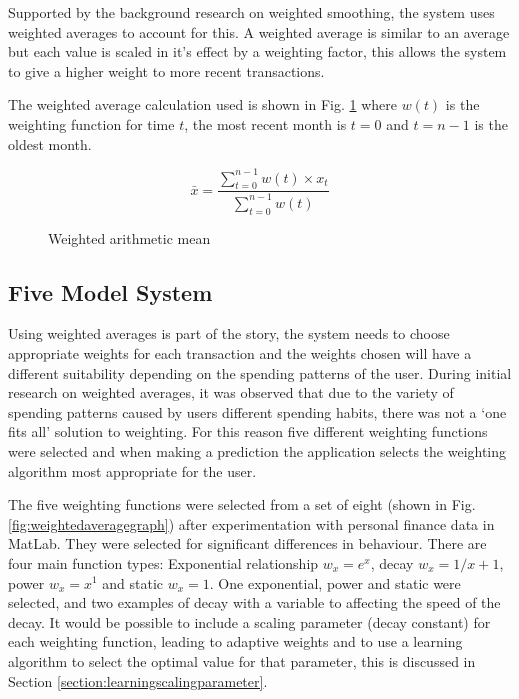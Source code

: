 Supported by the background research on weighted smoothing, the system uses weighted averages to account for this. A weighted average is similar to an average but each value is scaled in it's effect by a weighting factor, this allows the system to give a higher weight to more recent transactions.

The weighted average calculation used is shown in Fig. \ref{fig:weighting} where $w(t)$ is the weighting function for time $t$, the most recent month is $t = 0$ and $t = n - 1$ is the oldest month. 

\begin{figure}[h]
    \centering
    \[
        \bar{x} = 
        \frac{
                \sum\limits^{n-1}_{t=0}{w(t) \times x_t}
            }{
                \sum\limits_{t=0}^{n-1}{w(t)}
        } 
    \]
    \caption{Weighted arithmetic mean}
    \label{fig:weighting}
\end{figure}

\subsection{Five Model System}
Using weighted averages is part of the story, the system needs to choose appropriate weights for each transaction and the weights chosen will have a different suitability depending on the spending patterns of the user.
% 
During initial research on weighted averages, it was observed that due to the variety of spending patterns caused by users different spending habits, there was not a `one fits all' solution to weighting.
%
For this reason five different weighting functions were selected and when making a prediction the application selects the weighting algorithm most appropriate for the user.

The five weighting functions were selected from a set of eight (shown in Fig. \ref{fig:weightedaveragegraph}) after experimentation with personal finance data in MatLab. They were selected for significant differences in behaviour.
%
There are four main function types: Exponential relationship $w_x = e^{x}$, decay $w_x = {1}/{x + 1}$, power $w_x = x^1 $ and static $w_x = 1$. One exponential, power and static were selected, and two examples of decay with a variable to affecting the speed of the decay. It would be possible to include a scaling parameter (decay constant) for each weighting function, leading to adaptive weights and to use a learning algorithm to select the optimal value for that parameter, this is discussed in Section \ref{section:learningscalingparameter}.

